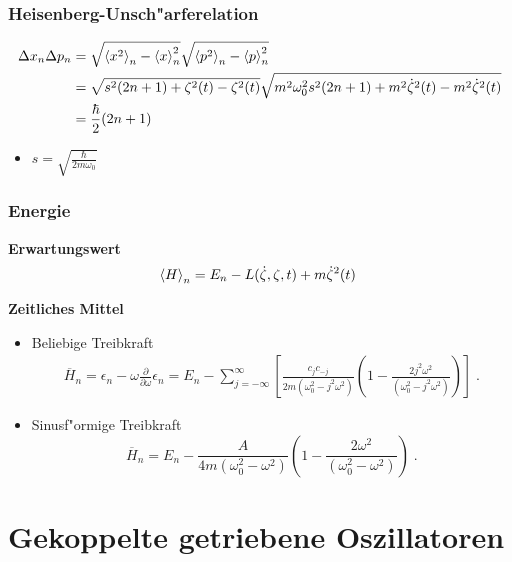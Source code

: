 \begin{frame}
  \frametitle{Heisenberg-Unsch"arferelation}
  \begin{align}
    \Delta x_n\Delta p_n &= \sqrt{\braket{x^2}_n-\braket{x}^2_n}\sqrt{\braket{p^2}_n-\braket{p}^2_n} \notag\\
    &= \sqrt{s^2(2n+1)+\zeta^2(t)-\zeta^2(t)}\sqrt{m^2\omega^2_0s^2(2n+1)+m^2\dot\zeta^2(t)-m^2\dot\zeta^2(t)} \notag\\
    &= \frac{\hbar}{2}(2n+1) \;
  \end{align}
  \begin{itemize}
    \item  $s = \sqrt{\frac{\hbar}{2m\omega_0}}$
  \end{itemize}
\end{frame}



\begin{frame}
  \frametitle{Energie}
  \textbf{Erwartungswert}
  \begin{align}
    \braket{H}_n = E_n - L(\dot{\zeta},\zeta,t) + m\dot{\zeta}^2(t) \;
  \end{align}

  \textbf{Zeitliches Mittel}
  \begin{itemize}
    \item Beliebige Treibkraft
    \begin{align}
      \overline{H}_n = \epsilon_n - \omega\frac{\partial}{\partial \omega}\epsilon_n
      = E_n - \sum_{j=-\infty}^{\infty} \left[ \frac{c_jc_{-j}}{2m(\omega_0^2-j^2\omega^2)}\left( 1-\frac{2j^2\omega^2}{(\omega_0^2-j^2\omega^2)}\right) \right] \; .
    \end{align}

    \item Sinusf"ormige Treibkraft
    \begin{equation}
      \overline{H}_n = E_n - \frac{A}{4m(\omega_0^2-\omega^2)}\left(1-\frac{2\omega^2}{(\omega_0^2-\omega^2)}\right) \; .
      \label{mittleres_H}
    \end{equation}
  \end{itemize}
\end{frame}





\section{Gekoppelte getriebene Oszillatoren}
